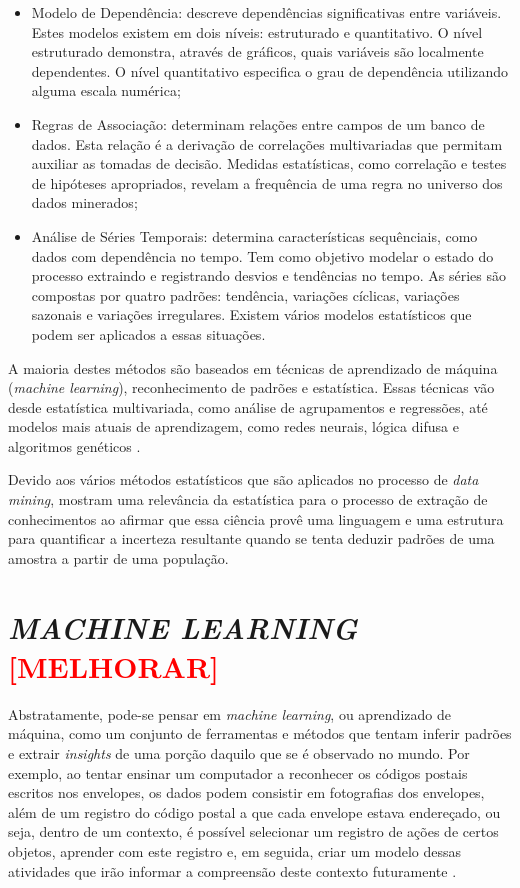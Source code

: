 \begin{itemize}
	\item Modelo de Dependência: descreve dependências significativas entre variáveis. Estes modelos existem em dois níveis: estruturado e quantitativo. O nível estruturado demonstra, através de gráficos, quais variáveis são localmente dependentes. O nível quantitativo especifica o grau de dependência utilizando alguma escala numérica;
	
	\item Regras de Associação: determinam relações entre campos de um banco de dados. Esta relação é a derivação de correlações multivariadas que permitam auxiliar as tomadas de decisão. Medidas estatísticas, como correlação e testes de hipóteses apropriados, revelam a frequência de uma regra no universo dos dados minerados;
	
	\item Análise de Séries Temporais: determina características sequênciais, como dados com dependência no tempo. Tem como objetivo modelar o estado do processo extraindo e registrando desvios e tendências no tempo. As séries são compostas por quatro padrões: tendência, variações cíclicas, variações sazonais e variações irregulares. Existem vários modelos estatísticos que podem ser aplicados a essas situações.
\end{itemize}

A maioria destes métodos são baseados em técnicas de aprendizado de máquina (\textit{machine learning}), reconhecimento de padrões e estatística. Essas técnicas vão desde estatística multivariada, como análise de agrupamentos e regressões, até modelos mais atuais de aprendizagem, como redes neurais, lógica difusa e algoritmos genéticos \cite{conceito-data-mining}.

Devido aos vários métodos estatísticos que são aplicados no processo de \textit{data mining},  mostram uma relevância da estatística para o processo de extração de conhecimentos ao afirmar que essa ciência provê uma linguagem e uma estrutura para quantificar a incerteza resultante quando se tenta deduzir padrões de uma amostra a partir de uma população.

\section{\textit{MACHINE LEARNING} \textbf{\textcolor{red}{[MELHORAR]}}}\label{sec:machine-learning}
Abstratamente, pode-se pensar em \textit{machine learning}, ou aprendizado de máquina, como um conjunto de ferramentas e métodos que tentam inferir padrões e extrair \textit{insights} de uma porção daquilo que se é observado no mundo. Por exemplo, ao tentar ensinar um computador a reconhecer os códigos postais escritos nos envelopes, os dados podem consistir em fotografias dos envelopes, além de um registro do código postal a que cada envelope estava endereçado, ou seja, dentro de um contexto, é possível selecionar um registro de ações de certos objetos, aprender com este registro e, em seguida, criar um modelo dessas atividades que irão informar a compreensão deste contexto futuramente \cite{machine-hacker}.

